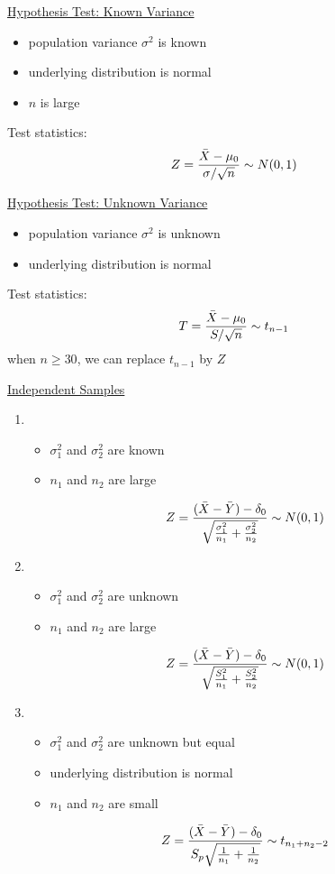 \documentclass[a4paper,1pt,landscape]{article}
\begin{document}
\begin{multicols}{3}
\underline{Hypothesis Test: Known Variance}\\
\begin{itemize}
    \item population variance $\sigma^2$ is known
    \item underlying distribution is normal
    \item $n$ is large
\end{itemize}
Test statistics:
$$Z=\frac{\Bar{X}-\mu_0}{\sigma/\sqrt{n}}\sim N(0,1)$$

\underline{Hypothesis Test: Unknown Variance}\\
\begin{itemize}
    \item population variance $\sigma^2$ is unknown
    \item underlying distribution is normal
\end{itemize}
Test statistics:
$$T=\frac{\Bar{X}-\mu_0}{S/\sqrt{n}}\sim t_{n-1}$$
when $n \geq 30$, we can replace $t_{n-1}$ by $Z$

\underline{Independent Samples}
\begin{enumerate}
    \item 
        \begin{itemize}
            \item $\sigma_1^2$ and $\sigma_2^2$ are known
            \item $n_1$ and $n_2$ are large
        \end{itemize}
        $$Z = \frac{(\Bar{X}-\Bar{Y}) - \delta_0}{\sqrt{\frac{\sigma_1^2}{n_1}+\frac{\sigma_2^2}{n_2}}}\sim N(0,1)$$

    \item 
        \begin{itemize}
            \item $\sigma_1^2$ and $\sigma_2^2$ are unknown
            \item $n_1$ and $n_2$ are large
        \end{itemize}
        $$Z = \frac{(\Bar{X}-\Bar{Y}) - \delta_0}{\sqrt{\frac{S_1^2}{n_1}+\frac{S_2^2}{n_2}}}\sim N(0,1)$$

    \item 
        \begin{itemize}
            \item $\sigma_1^2$ and $\sigma_2^2$ are unknown but equal
            \item underlying distribution is normal
            \item $n_1$ and $n_2$ are small
        \end{itemize}
        $$Z = \frac{(\Bar{X}-\Bar{Y}) - \delta_0}{S_p\sqrt{\frac{1}{n_1}+\frac{1}{n_2}}}\sim t_{n_1+n_2-2}$$
\end{enumerate}


\end{multicols}
\end{document}
